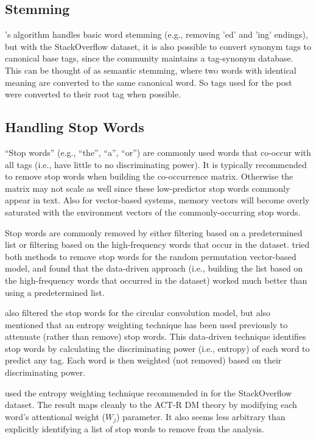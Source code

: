 \documentclass[man,floatsintext,donotrepeattitle]{apa6}
\begin{document}
\subsection{Stemming}

\textcite{Owoputi2013}'s algorithm handles basic word stemming (e.g., removing 'ed' and 'ing' endings), but
with the StackOverflow dataset, it is also possible to convert synonym tags to canonical base tags, since the community maintains a tag-synonym database.
This can be thought of as semantic stemming, where two words with identical meaning are converted to the same canonical word.
So tags used for the post were converted to their root tag when possible.

\subsection{Handling Stop Words}

``Stop words'' (e.g., ``the'', ``a'', ``or'') are commonly used words that co-occur with all tags (i.e., have little to no discriminating power).
It is typically recommended \parencite{Bird2009} to remove stop words when building the co-occurrence matrix.
Otherwise the matrix may not scale as well since these low-predictor stop words commonly appear in text.
Also for vector-based systems, memory vectors will become overly saturated with the environment vectors of the commonly-occurring stop words.

Stop words are commonly removed by either filtering based on a predetermined list or filtering based on the high-frequency words that occur in the dataset.
\textcite{Sahlgren2008} tried both methods to remove stop words for the random permutation vector-based model, and found that the data-driven approach
(i.e., building the list based on the high-frequency words that occurred in the dataset) worked much better than using a predetermined list.

\textcite{Jones2007} also filtered the stop words for the circular convolution model,
but also mentioned that an entropy weighting technique \parencite{Dumais1991} has been used previously to attenuate (rather than remove) stop words.
This data-driven technique identifies stop words by calculating the discriminating power (i.e., entropy) of each word to predict any tag.
Each word is then weighted (not removed) based on their discriminating power.

\textcite{Stanley2013} used the entropy weighting technique recommended in \textcite{Dumais1991} for the StackOverflow dataset.
The result maps cleanly to the ACT-R DM theory by modifying each word's attentional weight ($W_{j}$) parameter.
It also seems less arbitrary than explicitly identifying a list of stop words to remove from the analysis.
\end{document}
